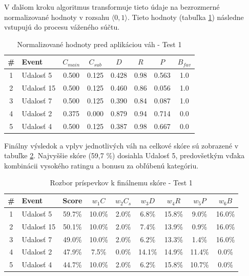 V ďalšom kroku algoritmus transformuje tieto údaje na bezrozmerné normalizované hodnoty v rozsahu $\langle 0, 1 \rangle$. Tieto hodnoty (tabuľka \ref{tab:norm_test1}) následne vstupujú do procesu váženého súčtu.

\begin{table}[H]
\centering
\small
\begin{tabular}{|c|l|c|c|c|c|c|c|}
\hline
\textbf{\#} & \textbf{Event} & $C_{main}$ & $C_{sub}$ & $D$ & $R$ & $P$ & $B_{fav}$ \\
\hline
1 & Udalosť 5 & 0.500 & 0.125 & 0.428 & 0.98 & 0.563 & 1.0 \\
2 & Udalosť 15 & 0.500 & 0.125 & 0.460 & 0.86 & 0.056 & 1.0 \\
3 & Udalosť 7 & 0.500 & 0.125 & 0.390 & 0.84 & 0.087 & 1.0 \\
4 & Udalosť 2 & 0.375 & 0.000 & 0.879 & 0.94 & 0.714 & 0.0 \\
5 & Udalosť 4 & 0.500 & 0.125 & 0.387 & 0.98 & 0.667 & 0.0 \\
\hline
\end{tabular}
\caption{Normalizované hodnoty pred aplikáciou váh - Test 1}
\label{tab:norm_test1}
\end{table}

Finálny výsledok a vplyv jednotlivých váh na celkové skóre sú zobrazené v tabuľke \ref{tab:vysledky_test1}. Najvyššie skóre (59,7 \%) dosiahla Udalosť 5, predovšetkým vďaka kombinácii vysokého ratingu a bonusu za obľúbenú kategóriu.

\begin{table}[H]
\centering
\small
\begin{tabular}{|c|l|c|c|c|c|c|c|c|}
\hline
\textbf{\#} & \textbf{Event} & \textbf{Score} & $w_1 C$ & $w_2 C_s$ & $w_3 D$ & $w_4 R$ & $w_5 P$ & $w_6 B$ \\
\hline
1 & Udalosť 5  & 59.7\% & 10.0\% & 2.0\% & 6.8\%  & 15.8\% & 9.0\%  & 16.0\% \\
2 & Udalosť 15 & 50.1\% & 10.0\% & 2.0\% & 7.4\%  & 13.9\% & 0.9\%  & 16.0\% \\
3 & Udalosť 7  & 49.0\% & 10.0\% & 2.0\% & 6.2\%  & 13.3\% & 1.4\%  & 16.0\% \\
4 & Udalosť 2  & 47.9\% & 7.5\%  & 0.0\% & 14.1\% & 14.9\% & 11.4\% & 0.0\% \\
5 & Udalosť 4  & 44.7\% & 10.0\% & 2.0\% & 6.2\%  & 15.8\% & 10.7\% & 0.0\% \\
\hline
\end{tabular}
\caption{Rozbor príspevkov k finálnemu skóre - Test 1}
\label{tab:vysledky_test1}
\end{table}

